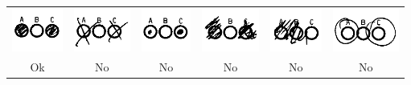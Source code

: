 \documentclass[10pt]{standalone}
\begin{document}
\begin{sf}
\bgroup
\begin{tabular}{cccccc}
\includegraphics[height=40pt]{omr_ok.png} & 
\includegraphics[height=40pt]{omr_no_1.png} & 
\includegraphics[height=40pt]{omr_no_2.png} &
\includegraphics[height=40pt]{omr_no_3.png} &
\includegraphics[height=40pt]{omr_no_4.png} &
\includegraphics[height=40pt]{omr_no_5.png} \\[-1.2em]
Ok & No & No & No & No & No \\
\end{tabular}
\egroup
\end{sf}
\end{document}
